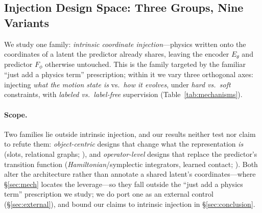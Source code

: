 \subsection{Injection Design Space: Three Groups, Nine Variants}
\label{sec:designspace}

We study one family: \emph{intrinsic coordinate injection}---physics written onto the coordinates of a latent the predictor already shares, leaving the encoder $E_\theta$ and predictor $F_\phi$ otherwise untouched. This is the family targeted by the familiar ``just add a physics term'' prescription; within it we vary three orthogonal axes: injecting \emph{what the motion state is} vs.\ \emph{how it evolves}, under \emph{hard vs.\ soft} constraints, with \emph{labeled vs.\ label-free} supervision (Table~\ref{tab:mechanisms}).

\paragraph{Scope.} Two families lie outside intrinsic injection, and our results neither test nor claim to refute them: \emph{object-centric} designs that change what the representation \emph{is} (slots, relational graphs; \citealp{locatello2020slot,battaglia2016interaction,sanchez2020gns}), and \emph{operator-level} designs that replace the predictor's transition function (\emph{Hamiltonian}/symplectic integrators, learned contact; \citealp{cranmer2020lnn}). Both alter the architecture rather than annotate a shared latent's coordinates---where \S\ref{sec:mech} locates the leverage---so they fall outside the ``just add a physics term'' prescription we study; we do port one as an external control (\S\ref{sec:external}), and bound our claims to intrinsic injection in \S\ref{sec:conclusion}.

